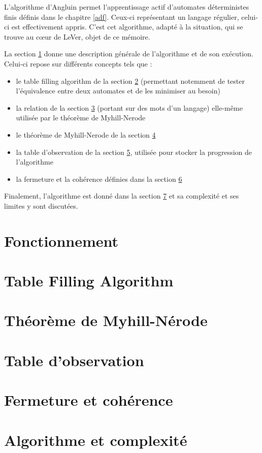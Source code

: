 L'algorithme d'Angluin permet l'apprentissage actif d'automates déterministes finis définis dans le chapitre \ref{adf}. Ceux-ci représentant un langage régulier, celui-ci est effectivement appris. C'est cet algorithme, adapté à la situation, qui se trouve au cœur de LeVer, objet de ce mémoire.

La section \ref{angluin:fonc} donne une description générale de l'algorithme et de son exécution. Celui-ci repose sur différents concepts tels que :
\begin{itemize}
  \item le table filling algorithm de la section \ref{angluin:tfa} (permettant notemment de tester l'équivalence entre deux automates et de les minimiser au besoin)
  \item la relation \rl de la section \ref{angluin:rl} (portant sur des mots d'un langage) elle-même utilisée par le théorème de Myhill-Nerode
  \item le théorème de Myhill-Nerode de la section \ref{angluin:nerode}
  \item la table d'observation de la section \ref{angluin:to}, utilisée pour stocker la progression de l'algorithme
  \item la fermeture et la cohérence définies dans la section \ref{angluin:ferm}
\end{itemize}

Finalement, l'algorithme est donné dans la section \ref{angluin:algo} et sa complexité et ses limites y sont discutées.

\section{Fonctionnement}\label{angluin:fonc}
\section{Table Filling Algorithm}\label{angluin:tfa}
\section{\rl}\label{angluin:rl}
\section{Théorème de Myhill-Nérode}\label{angluin:nerode}
\section{Table d'observation}\label{angluin:to}
\section{Fermeture et cohérence}\label{angluin:ferm}
\section{Algorithme et complexité}\label{angluin:algo}
